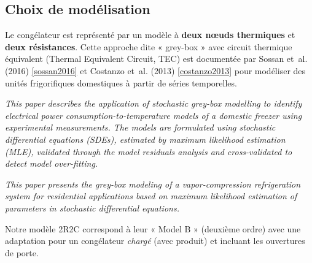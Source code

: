 \documentclass[11pt,a4paper]{article}
\begin{document}
\subsection{Choix de modélisation}

Le congélateur est représenté par un modèle à \textbf{deux nœuds thermiques} et
\textbf{deux résistances}. Cette approche dite « grey-box » avec circuit thermique
équivalent (Thermal Equivalent Circuit, TEC) est documentée par Sossan et~al. (2016)
\ref{sossan2016} et Costanzo et~al. (2013) \ref{costanzo2013} pour modéliser des
unités frigorifiques domestiques à partir de séries temporelles.

\begin{tcolorbox}[breakable,enhanced jigsaw,colback=yellow!10,colframe=yellow!50!black,boxrule=0.4pt,arc=2pt,
title=\textbf{Extrait textuel — Sossan et~al.\ (2016), Abstract}]
\og{} \emph{This paper describes the application of stochastic grey-box modelling to
identify electrical power consumption-to-temperature models of a domestic freezer using
experimental measurements. The models are formulated using stochastic differential
equations (SDEs), estimated by maximum likelihood estimation (MLE), validated through
the model residuals analysis and cross-validated to detect model over-fitting.} \fg{}
\end{tcolorbox}

\begin{tcolorbox}[breakable,enhanced jigsaw,colback=yellow!10,colframe=yellow!50!black,boxrule=0.4pt,arc=2pt,
title=\textbf{Extrait textuel — Costanzo et~al.\ (2013), Abstract}]
\og{} \emph{This paper presents the grey-box modeling of a vapor-compression refrigeration
system for residential applications based on maximum likelihood estimation of parameters
in stochastic differential equations.} \fg{}
\end{tcolorbox}

Notre modèle 2R2C correspond à leur « Model B » (deuxième ordre) avec une adaptation pour
un congélateur \emph{chargé} (avec produit) et incluant les ouvertures de porte.

\begin{center}
\end{center}
\end{document}

